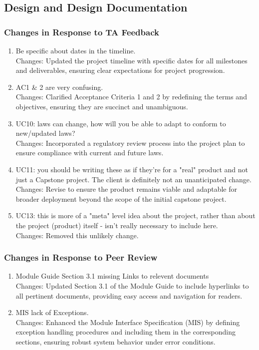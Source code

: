 \documentclass{article}
\begin{document}
\subsection{Design and Design Documentation}

\subsubsection{Changes in Response to TA Feedback}

\begin{enumerate}
        \item Be specific about dates in the timeline.\\
        Changes: Updated the project timeline with specific dates for 
                all milestones and deliverables, ensuring clear expectations for project progression.
        \item AC1 \& 2 are very confusing.\\
        Changes: Clarified Acceptance Criteria 1 and 2 by redefining the terms 
                and objectives, ensuring they are succinct and unambiguous.
        \item UC10: laws can change, how will you be able to adapt to conform to 
        new/updated laws?\\
        Changes: Incorporated a regulatory review process into the project plan to ensure compliance with current and future laws.
        \item UC11: you should be writing these as if they're for a "real" product 
        and not just a Capstone project. The client is definitely not an unanticipated change.\\
        Changes: Revise to ensure the product remains viable and adaptable for broader 
        deployment beyond the scope of the initial capstone project.
        \item UC13: this is more of a "meta" level idea about the project, rather 
        than about the project (product) itself - isn't really necessary to include here.\\
        Changes: Removed this unlikely change.
\end{enumerate}    

\subsubsection{Changes in Response to Peer Review}
\begin{enumerate}
        \item Module Guide Section 3.1 missing Links to relevent documents\\
        Changes: Updated Section 3.1 of the Module Guide to include hyperlinks to all pertinent documents, providing easy access and navigation for readers.
        \item MIS lack of Exceptions.\\
        Changes: Enhanced the Module Interface Specification (MIS) by defining exception handling procedures and including them in the corresponding sections, ensuring robust system behavior under error conditions.
\end{enumerate}    
\end{document}
